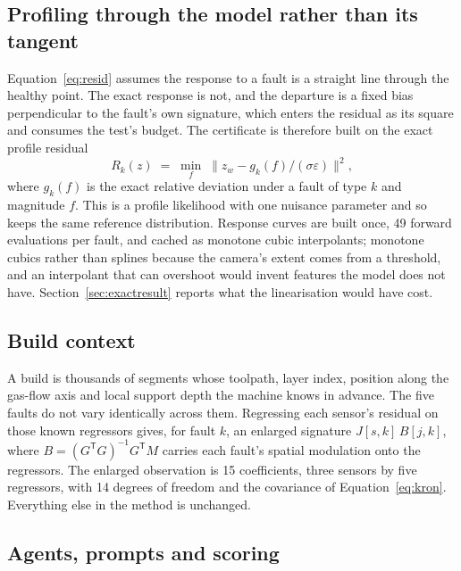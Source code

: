 \documentclass[preprint,12pt]{elsarticle}
\begin{document}
\subsection{Profiling through the model rather than its tangent}
\label{sec:exact}

Equation~\eqref{eq:resid} assumes the response to a fault is a straight line
through the healthy point. The exact response is not, and the departure is a
fixed bias perpendicular to the fault's own signature, which enters the residual
as its square and consumes the test's budget. The certificate is therefore built
on the exact profile residual
%
\begin{equation}
R_k(z) \;=\; \min_{f} \;
\bigl\| z_w - g_k(f) / (\sigma\varepsilon) \bigr\|^2 ,
\label{eq:exact}
\end{equation}
%
where $g_k(f)$ is the exact relative deviation under a fault of type $k$ and
magnitude $f$. This is a profile likelihood with one nuisance parameter and so
keeps the same reference distribution. Response curves are built once, 49
forward evaluations per fault, and cached as monotone cubic interpolants;
monotone cubics rather than splines because the camera's extent comes from a
threshold, and an interpolant that can overshoot would invent features the model
does not have. Section~\ref{sec:exactresult} reports what the linearisation
would have cost.

\subsection{Build context}
\label{sec:context}

A build is thousands of segments whose toolpath, layer index, position along the
gas-flow axis and local support depth the machine knows in advance. The five
faults do not vary identically across them. Regressing each sensor's residual on
those known regressors gives, for fault $k$, an enlarged signature
$J[s,k]\,B[j,k]$, where $B = (G^{\mathsf T}G)^{-1}G^{\mathsf T}M$ carries each
fault's spatial modulation onto the regressors. The enlarged observation is 15
coefficients, three sensors by five regressors, with 14 degrees of freedom and
the covariance of Equation~\eqref{eq:kron}. Everything else in the method is
unchanged.

\subsection{Agents, prompts and scoring}
\label{sec:agents}
\end{document}
